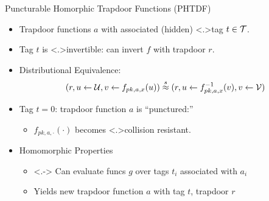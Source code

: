 \documentclass[shadow,xcolor=pdftex,svgnames,table,t]{beamer}
\begin{document}
\begin{frame}[label=PHTDF]{Puncturable Homorphic Trapdoor Functions (PHTDF)}
\begin{tikzpicture}[bob/.style={align=flush center, text width=10em},
eval/.style={draw,rectangle,fill=green!20,align=flush center}
]
\end{tikzpicture}
\begin{itemize}
\item<+-> Trapdoor functions $a$ with associated (hidden) \alert<.>{tag} $t \in \calT$.
\smallskip
\item<+-> Tag $t$ is \alert<.>{invertible}: \onslide<+-> can invert $f$ with trapdoor $r$.
\smallskip
\item<+-> Distributional Equivalence:
\[(r,u \gets \mathcal{U}, v \gets f_{pk,a,x}(u)) \statind (r,u \gets f^{-1}_{pk,a,x}(v),v \gets \mathcal{V})\]
\item<+-> Tag $t=0$: trapdoor function $a$ is ``punctured:''
\begin{itemize}
\smallskip
\item<+-> $f_{pk,a,\cdot}(\cdot)$ becomes \alert<.>{collision
    resistant}.
\end{itemize}
\smallskip
\item<+-> Homomorphic Properties
\begin{itemize}
\smallskip
\item<.-> Can evaluate funcs $g$ over tags $t_i$ associated with $a_i$
\smallskip
\item<+-> Yields new trapdoor function $a$ with tag $t$, trapdoor $r$
\end{itemize}
\end{itemize}
\end{frame}
\end{document}
